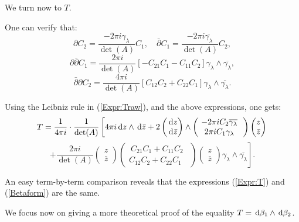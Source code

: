 \documentclass[a4paper,12pt]{article}
\theoremstyle{remark}
\begin{document}
\begin{remark}
	We turn now to $T$.
		
	One can verify that:
	\[
	\partial C_2=\frac{-2\pi i{\gamma_{\lambda}}}{\det(A)}C_1, \quad \bar{\partial} C_1=\frac{-2\pi i\overline{\gamma_{\lambda}}}{\det(A)}C_2,
	\]
	\[
	\partial \bar{\partial} C_1=\frac{2\pi i}{\det (A)}[-C_{21}C_1-C_{11}C_2]\gamma_{\lambda}\wedge \overline{\gamma_{\lambda}}, 
	\]
	\[  \bar{\partial} \partial C_2=\frac{4\pi i}{\det (A)}[C_{12}C_2+C_{22}C_1]\gamma_{\lambda}\wedge \overline{\gamma_{\lambda}}.
	\]
	
	Using the Leibniz rule in (\ref{Expr:Traw}), and the above expressions, one gets:
	\[
	T=\frac{1}{4\pi i}\cdot \frac{1}{\det (A)}\left[ 4 \pi i\,\mathrm d z \wedge \,\mathrm d \bar{z}+2 \begin{pmatrix}
	\,\mathrm d z \\ \,\mathrm d \bar{z}
	\end{pmatrix}\wedge \begin{pmatrix}
	\  - 2 \pi iC_2 \overline{\gamma_{\lambda}} \ \ \\  \ { 2 \pi i }C_1 \gamma_{\lambda} \ \
	\end{pmatrix}\begin{pmatrix}
	 z \\  \bar{z}
	\end{pmatrix}\right.
	\]
	\begin{equation}\label{Expr:T}
		\left.+\frac{2 \pi i}{\det (A)}\begin{pmatrix}
		z \\ \bar{z}
		\end{pmatrix}\begin{pmatrix}
		\ C_{21}C_1+C_{11}C_2 \ \  \\ C_{12}C_2+C_{22}C_1
		\end{pmatrix}\begin{pmatrix}
		z \\ \bar{z}
		\end{pmatrix}\gamma_{\lambda}\wedge \overline{\gamma_{\lambda}}\right].
	\end{equation}
	
	An easy term-by-term comparison reveals that the expressions (\ref{Expr:T}) and (\ref{Betaform}) are the same.
\end{remark}


We focus now on giving a more theoretical proof of the equality $T=\,\mathrm d \beta_1 \wedge \,\mathrm d \beta_2$.
\end{document}
